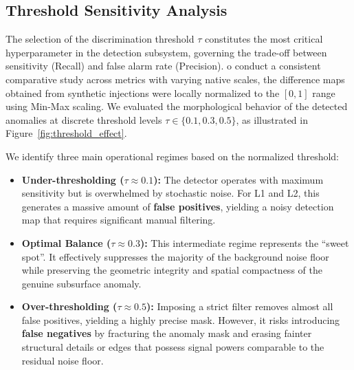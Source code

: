 \subsection{Threshold Sensitivity Analysis}
\label{subsec:threshold_analysis}

The selection of the discrimination threshold $\tau$ constitutes the most critical hyperparameter in the detection subsystem, governing the trade-off between sensitivity (Recall) and false alarm rate (Precision). 
o conduct a consistent comparative study across metrics with varying native scales, the difference maps obtained from synthetic injections were locally normalized to the $[0, 1]$ range using Min-Max scaling.
We evaluated the morphological behavior of the detected anomalies at discrete threshold levels $\tau \in \{0.1, 0.3, 0.5\}$, as illustrated in Figure~\ref{fig:threshold_effect}.

We identify three main operational regimes based on the normalized threshold:
\begin{itemize}
    \item \textbf{Under-thresholding ($\tau \approx 0.1$):} The detector operates with maximum sensitivity but is overwhelmed by stochastic noise. For L1 and L2, this generates a massive amount of \textbf{false positives}, yielding a noisy detection map that requires significant manual filtering.
    \item \textbf{Optimal Balance ($\tau \approx 0.3$):} This intermediate regime represents the \enquote{sweet spot}. It effectively suppresses the majority of the background noise floor while preserving the geometric integrity and spatial compactness of the genuine subsurface anomaly.
    \item \textbf{Over-thresholding ($\tau \approx 0.5$):} Imposing a strict filter removes almost all false positives, yielding a highly precise mask. However, it risks introducing \textbf{false negatives} by fracturing the anomaly mask and erasing fainter structural details or edges that possess signal powers comparable to the residual noise floor.
\end{itemize}

